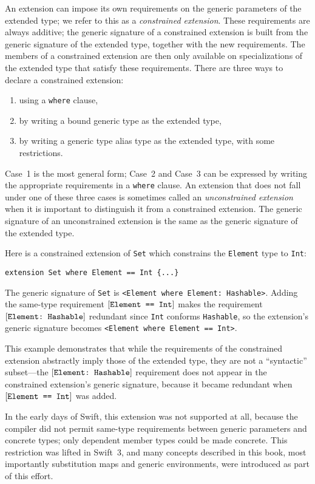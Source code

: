 \documentclass[../generics]{subfiles}
\begin{document}
An extension can impose its own requirements on the generic parameters of the extended type; we refer to this as a \emph{constrained extension}. These requirements are always additive; the generic signature of a constrained extension is built from the generic signature of the extended type, together with the new requirements. The members of a constrained extension are then only available on specializations of the extended type that satisfy these requirements. There are three ways to declare a constrained extension:
\begin{enumerate}
\item using a \texttt{where} clause,
\item by writing a bound generic type as the extended type,
\item by writing a generic type alias type as the extended type, with some restrictions.
\end{enumerate}
Case~1 is the most general form; Case~2 and Case~3 can be expressed by writing the appropriate requirements in a \texttt{where} clause. An extension that does not fall under one of these three cases is sometimes called an \emph{unconstrained extension} when it is important to distinguish it from a constrained extension. The generic signature of an unconstrained extension is the same as the generic signature of the extended type. 

Here is a constrained extension of \texttt{Set} which constrains the \texttt{Element} type to \texttt{Int}:
\begin{Verbatim}
extension Set where Element == Int {...}
\end{Verbatim}
The generic signature of \texttt{Set} is \verb|<Element where Element: Hashable>|. Adding the same-type requirement $[\texttt{Element == Int}]$ makes the requirement $[\texttt{Element:~Hashable}]$ redundant since \texttt{Int} conforms \texttt{Hashable}, so the extension's generic signature becomes \verb|<Element where Element == Int>|.

This example demonstrates that while the requirements of the constrained extension abstractly imply those of the extended type, they are not a ``syntactic'' subset---the $[\texttt{Element:~Hashable}]$ requirement does not appear in the constrained extension's generic signature, because it became redundant when $[\texttt{Element == Int}]$ was added.

In the early days of Swift, this extension was not supported at all, because the compiler did not permit same-type requirements between generic parameters and concrete types; only dependent member types could be made concrete. This restriction was lifted in Swift~3, and many concepts described in this book, most importantly substitution maps and generic environments, were introduced as part of this effort.
\end{document}

